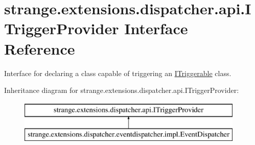 \hypertarget{interfacestrange_1_1extensions_1_1dispatcher_1_1api_1_1_i_trigger_provider}{\section{strange.\-extensions.\-dispatcher.\-api.\-I\-Trigger\-Provider Interface Reference}
\label{interfacestrange_1_1extensions_1_1dispatcher_1_1api_1_1_i_trigger_provider}
}


Interface for declaring a class capable of triggering an \hyperlink{interfacestrange_1_1extensions_1_1dispatcher_1_1api_1_1_i_triggerable}{I\-Triggerable} class.  


Inheritance diagram for strange.\-extensions.\-dispatcher.\-api.\-I\-Trigger\-Provider\-:\begin{figure}[H]
\begin{center}
\leavevmode
\includegraphics[height=2.000000cm]{interfacestrange_1_1extensions_1_1dispatcher_1_1api_1_1_i_trigger_provider}
\end{center}
\end{figure}
